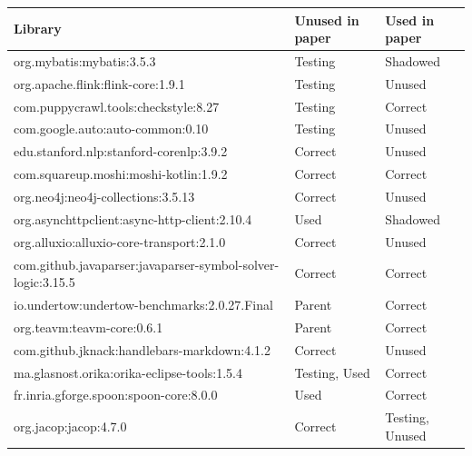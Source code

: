 \begin{table}[ht]
\begin{tabular}{|l|l|l|}
\hline
\textbf{Library} & \textbf{Unused in paper} & \textbf{Used in paper} \\ \hline
org.mybatis:mybatis:3.5.3                                   & Testing       & Shadowed        \\ \hline
org.apache.flink:flink-core:1.9.1                           & Testing       & Unused          \\ \hline
com.puppycrawl.tools:checkstyle:8.27                        & Testing       & Correct         \\ \hline
com.google.auto:auto-common:0.10                            & Testing       & Unused          \\ \hline
edu.stanford.nlp:stanford-corenlp:3.9.2                     & Correct       & Unused          \\ \hline
com.squareup.moshi:moshi-kotlin:1.9.2                       & Correct       & Correct         \\ \hline
org.neo4j:neo4j-collections:3.5.13                          & Correct       & Unused          \\ \hline
org.asynchttpclient:async-http-client:2.10.4                & Used          & Shadowed        \\ \hline
org.alluxio:alluxio-core-transport:2.1.0                    & Correct       & Unused          \\ \hline
com.github.javaparser:javaparser-symbol-solver-logic:3.15.5 & Correct       & Correct         \\ \hline
io.undertow:undertow-benchmarks:2.0.27.Final                & Parent        & Correct         \\ \hline
org.teavm:teavm-core:0.6.1                                  & Parent        & Correct         \\ \hline
com.github.jknack:handlebars-markdown:4.1.2                 & Correct       & Unused          \\ \hline
ma.glasnost.orika:orika-eclipse-tools:1.5.4                 & Testing, Used & Correct         \\ \hline
fr.inria.gforge.spoon:spoon-core:8.0.0                      & Used          & Correct         \\ \hline
org.jacop:jacop:4.7.0                                       & Correct       & Testing, Unused \\ \hline
\end{tabular}
\end{table}

